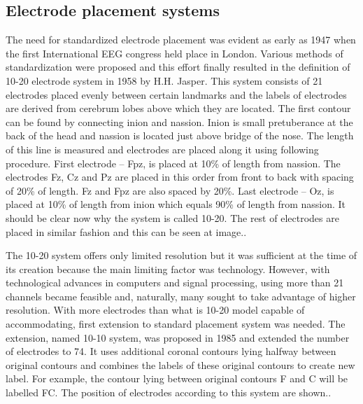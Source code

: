 \subsection{Electrode placement systems}
The need for standardized electrode placement was evident as early as 1947 when
the first International EEG congress held place in London. Various methods of
standardization were proposed and this effort finally resulted in the definition
of 10-20 electrode system in 1958 by H.H. Jasper. \cite{placeSys} 
This system consists of 21 electrodes placed evenly between certain landmarks
and the labels of electrodes are derived from cerebrum lobes above which they
are located. The first contour can be found by connecting inion and nassion.
Inion is small pretuberance at the back of the head and nassion is located just
above bridge of the nose. The length of this line is measured and electrodes are
placed along it using following procedure. First electrode -- Fpz, is placed at
10\% of length from nassion. The electrodes Fz, Cz and Pz are placed in this
order from front to back with spacing of 20\% of length. Fz and Fpz are also
spaced by 20\%. Last electrode -- Oz, is placed at 10\% of length from inion
which equals 90\% of length from nassion. It should be clear now why the system
is called 10-20. The rest of electrodes are placed in similar fashion and this
can be seen at image.. %

The 10-20 system offers only limited resolution but it was sufficient at the
time of its creation because the main limiting factor was technology. However,
with technological advances in computers and signal processing, using more than
21 channels became feasible and, naturally, many sought to take advantage of
higher resolution. With more electrodes than what is 10-20 model capable of
accommodating, first extension to standard placement system was needed. The
extension, named 10-10 system, was proposed in 1985 and extended the number of
electrodes to 74. It uses additional coronal contours lying halfway between
original contours and combines the labels of these original contours to create
new label. For example, the contour lying between original contours F and C will
be labelled FC. \cite{placeSys} The position of electrodes according to this
system are shown..


